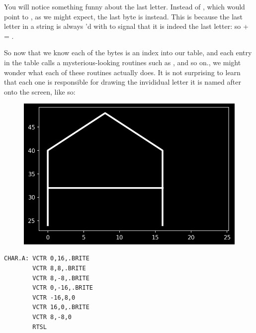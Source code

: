 You will notice something funny about the last letter. Instead of , which would point to 
, as we might expect, the last byte is  instead. This is because the last letter
in a string is always 'd with  to signal that it is indeed the last letter: so
 +  = .

So now that we know each of the bytes is an index into our  table, and each entry
in the table calls a mysterious-looking routines such as ,  and so on., we might
wonder what each of these routines actually does. It is not surprising to learn that each one is responsible
for drawing the invididual letter it is named after onto the screen, like so:

\begin{minipage}[c]{0.48\linewidth}
\begin{figure}[H]
    \centering
    \begin{adjustbox}{width=4cm,center}
      \includegraphics[width=12cm]{src/literals/A.png}%
    \end{adjustbox}
\end{figure}
\end{minipage}
\begin{minipage}[c]{0.48\linewidth}
\begin{lstlisting}[basicstyle=\scriptsize\ttfamily]
CHAR.A: VCTR 0,16,.BRITE
        VCTR 8,8,.BRITE
        VCTR 8,-8,.BRITE
        VCTR 0,-16,.BRITE
        VCTR -16,8,0
        VCTR 16,0,.BRITE
        VCTR 8,-8,0
        RTSL
\end{lstlisting}
\vspace*{\fill}
\end{minipage}

